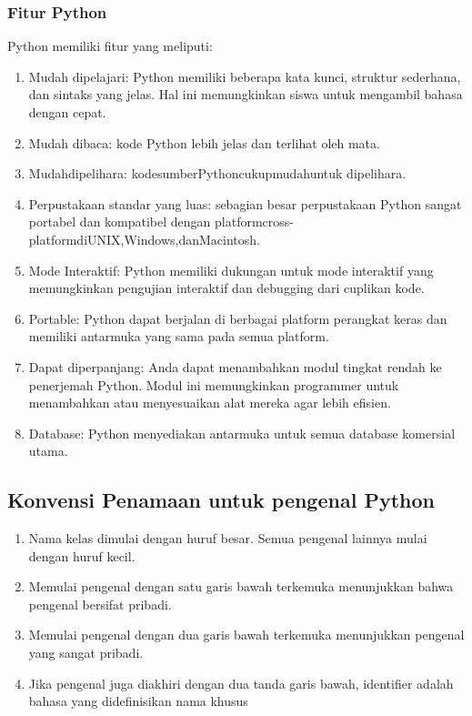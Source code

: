 \subsubsection{Fitur Python}
Python memiliki fitur yang meliputi:
	\begin{enumerate}
		\item Mudah dipelajari: Python memiliki beberapa kata kunci, struktur sederhana, dan sintaks yang jelas. Hal ini memungkinkan siswa untuk mengambil bahasa dengan cepat.
		\item Mudah dibaca: kode Python lebih jelas dan terlihat oleh mata.
		\item Mudahdipelihara: kodesumberPythoncukupmudahuntuk dipelihara.
		\item Perpustakaan standar yang luas: sebagian besar perpustakaan Python sangat portabel dan kompatibel dengan platformcross-platformdiUNIX,Windows,danMacintosh. 
		\item Mode Interaktif: Python memiliki dukungan untuk mode interaktif yang memungkinkan pengujian interaktif dan debugging dari cuplikan kode.
		\item Portable: Python dapat berjalan di berbagai platform perangkat keras dan memiliki antarmuka yang sama pada semua platform.
		\item Dapat diperpanjang: Anda dapat menambahkan modul tingkat rendah ke penerjemah Python. Modul ini memungkinkan programmer untuk menambahkan atau menyesuaikan alat mereka agar lebih eﬁsien.
		\item Database: Python menyediakan antarmuka untuk semua database komersial utama. 
	\end{enumerate}

\subsection{Konvensi Penamaan untuk pengenal Python}
	\begin{enumerate}
	    \item Nama kelas dimulai dengan huruf besar. Semua pengenal lainnya mulai dengan huruf kecil.
	    \item Memulai pengenal dengan satu garis bawah terkemuka menunjukkan bahwa pengenal bersifat pribadi.
	    \item Memulai pengenal dengan dua garis bawah terkemuka menunjukkan pengenal yang sangat pribadi.
	    \item Jika pengenal juga diakhiri dengan dua tanda garis bawah, identifier adalah bahasa yang didefinisikan nama khusus
	\end{enumerate}

